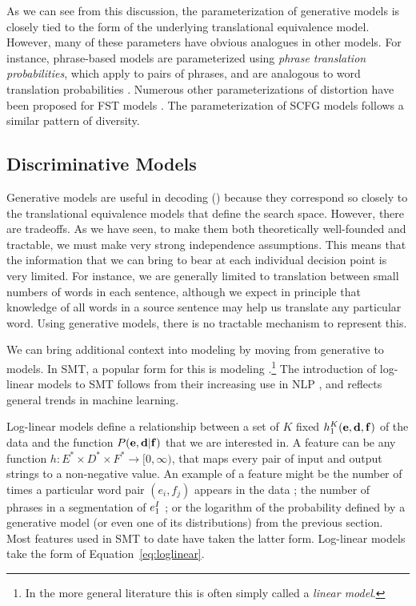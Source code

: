 As we can see from this discussion, 
the parameterization of generative models is closely
tied to the form of the underlying translational equivalence model.
However, many of these parameters have obvious analogues in other models.
For instance, phrase-based models are parameterized using
{\em phrase translation probabilities}, which apply to pairs of phrases,
and are analogous to word translation probabilities
\citep{Marcu:2002:emnlp,Koehn:2003:naacl}.
Numerous other parameterizations of distortion have been proposed for FST models
\citep{Al-Onaizan:2006:acl-coling,Vogel:1996:coling,Och:2000:coling,Toutanova:2002:emnlp,Lopez:2005:wpt,DeNero:2007:acl}.  
The parameterization of SCFG models follows a similar pattern of diversity.

\subsection{Discriminative Models}\label{sec:discriminative-models}

Generative models are useful
in decoding () because they
correspond so closely to the translational
equivalence models that define the search space.
However, there are tradeoffs.  As we have seen,
 to make them both theoretically well-founded and 
tractable, we must make very strong independence
assumptions.  This means that the
information that we can bring to bear at each individual
decision point is very limited.  For instance, we 
are generally limited to translation between small
numbers of words in each sentence, although we 
expect in principle that knowledge of all words
in a source sentence may help us translate any particular word.
Using generative models, there is no tractable 
mechanism to represent this.

We can bring additional context into modeling by moving from 
generative to  models.  In SMT,
a popular form for this is 
modeling \citep{Berger:1996:cl,Och:2002:acl}.\footnote{
In the more general literature this is often simply 
called a {\em linear model}.}  
The introduction
of log-linear models to SMT follows from
their increasing use in NLP  
\citep{Berger:1996:cl,Ratnaparkhi:1998:thesis,Smith:2006:thesis},
and reflects general trends in machine learning.

Log-linear models define a relationship between 
a set of $K$ fixed  $h_1^K({\bf e},{\bf d},{\bf f})$ 
of the data and the function $P({\bf e},{\bf d}|{\bf f})$
that we are interested in.  A feature can be 
any function $h : E^* \times D^* \times F^* \longrightarrow [0,\infty)$,
that maps every pair of input and output strings 
to a non-negative value.  An example of a 
feature might be the number of times a particular
word pair $(e_i,f_j)$ appears in the data 
\citep{Och:2002:acl}; the number of phrases
in a segmentation of $e_1^I$ \citep{Koehn:2004:pharaoh}; 
or the logarithm of the probability defined by  
a generative model (or even one of its distributions)
from the previous section.  Most features used in 
SMT to date have taken the latter form.  
Log-linear models take the form of Equation~\ref{eq:loglinear}.

